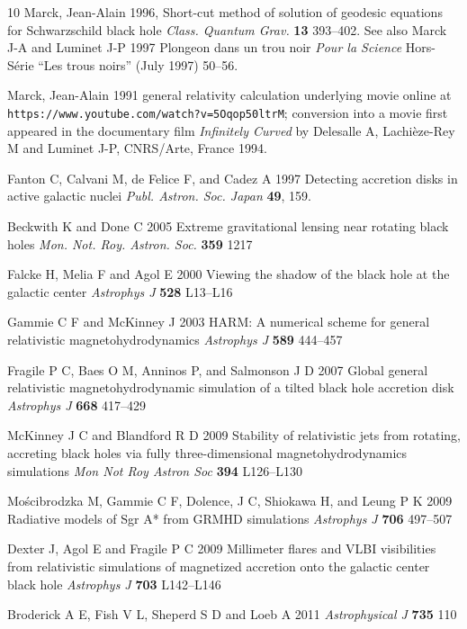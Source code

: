 \documentclass[12pt]{iopart}
\begin{document}
\begin{thebibliography}{10}
 Marck, Jean-Alain 1996, Short-cut method of solution of geodesic equations for Schwarzschild black
hole \emph{Class. Quantum Grav.} {\bf 13} 393--402. See also Marck J-A and Luminet J-P 1997 Plongeon dans un trou noir {\it Pour la
Science} Hors-S\'erie ``Les trous noirs'' (July 1997) 50--56.

 Marck, Jean-Alain 1991 general relativity calculation underlying movie online at \verb"https://www.youtube.com/watch?v=5Oqop50ltrM"; conversion into a movie
first appeared in the documentary film \emph{Infinitely Curved} 
by Delesalle A, Lachi\`eze-Rey M and Luminet J-P, CNRS/Arte, France 1994.

 Fanton  C, Calvani M, de Felice F, and Cadez A 1997 Detecting accretion disks in active galactic nuclei {\it Publ. Astron. Soc. Japan} {\bf 49}, 159.

 Beckwith K and Done C 2005 Extreme gravitational lensing near rotating black holes {\it Mon. Not. Roy. Astron. Soc.} {\bf 359} 1217

 Falcke H, Melia F and Agol E 2000 Viewing the shadow of the black hole at the galactic center {\it Astrophys J} {\bf 528} L13--L16

 Gammie C F and McKinney J 2003 HARM: A numerical scheme for general 
relativistic magnetohydrodynamics {\it Astrophys J} {\bf 589} 444--457

 Fragile P C, Baes O M, Anninos P, and Salmonson J D 2007 Global general relativistic magnetohydrodynamic simulation of a tilted black hole accretion disk {\it Astrophys J} {\bf 668} 417--429 

 McKinney J C and Blandford R D 2009 Stability of relativistic jets from rotating, accreting black holes via fully three-dimensional magnetohydrodynamics simulations {\it Mon Not Roy Astron Soc} {\bf 394} L126--L130

 Mo\'scibrodzka M, Gammie C F, Dolence, J C, Shiokawa H, and Leung P K 2009 Radiative models of Sgr A* from GRMHD simulations {\it Astrophys J} {\bf 706} 497--507

 Dexter J, Agol E and Fragile P C 2009 Millimeter flares and VLBI visibilities from relativistic simulations of magnetized accretion onto the galactic center black hole {\it Astrophys J} {\bf 703} L142--L146

 Broderick A E, Fish V L, Sheperd S D and Loeb A 2011 {\it Astrophysical J} {\bf 735} 110 


\end{thebibliography}
\end{document}
